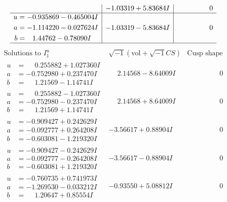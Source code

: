 \documentclass[1p]{elsarticle_modified}
\theoremstyle{definition}
\newcommand{\I}{\sqrt{-1}}
\begin{document}
$$\begin{array}{c|c|c}
 & -1.03319 + 5.83684 I & \phantom{-0.000000 } 0 \\ \hline\begin{aligned}
u &= -0.935869 - 0.465004 I \\
a &= -1.114220 - 0.027624 I \\
b &= \phantom{-}1.44762 - 0.78090 I\end{aligned}
 & -1.03319 - 5.83684 I & \phantom{-0.000000 } 0\\
 \hline 
 \end{array}$$\newpage$$\begin{array}{c|c|c}  
\text{Solutions to }I^u_{1}& \I (\text{vol} + \sqrt{-1}CS) & \text{Cusp shape}\\
 \hline 
\begin{aligned}
u &= \phantom{-}0.255882 + 1.027360 I \\
a &= -0.752980 + 0.237470 I \\
b &= \phantom{-}1.21569 - 1.14741 I\end{aligned}
 & \phantom{-}2.14568 - 8.64009 I & \phantom{-0.000000 } 0 \\ \hline\begin{aligned}
u &= \phantom{-}0.255882 - 1.027360 I \\
a &= -0.752980 - 0.237470 I \\
b &= \phantom{-}1.21569 + 1.14741 I\end{aligned}
 & \phantom{-}2.14568 + 8.64009 I & \phantom{-0.000000 } 0 \\ \hline\begin{aligned}
u &= -0.909427 + 0.242629 I \\
a &= -0.092777 + 0.264208 I \\
b &= -0.603081 - 1.219320 I\end{aligned}
 & -3.56617 + 0.88904 I & \phantom{-0.000000 } 0 \\ \hline\begin{aligned}
u &= -0.909427 - 0.242629 I \\
a &= -0.092777 - 0.264208 I \\
b &= -0.603081 + 1.219320 I\end{aligned}
 & -3.56617 - 0.88904 I & \phantom{-0.000000 } 0 \\ \hline\begin{aligned}
u &= -0.760735 + 0.741973 I \\
a &= -1.269530 - 0.033212 I \\
b &= \phantom{-}1.20647 + 0.85554 I\end{aligned}
 & -0.93550 + 5.08812 I & \phantom{-0.000000 } 0 \\ \hline\begin{aligned}

\end{aligned}
\end{array}$$
\end{document}

